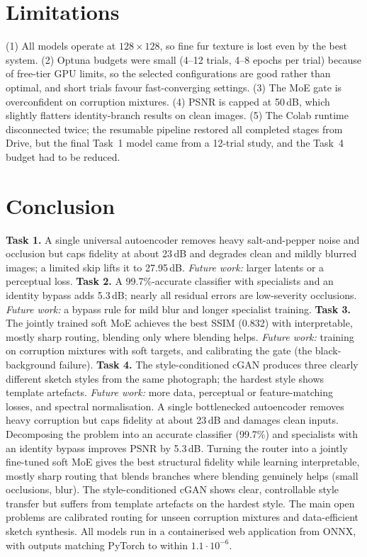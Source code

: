 \documentclass[conference]{IEEEtran}
\begin{document}
\section{Limitations}
(1) All models operate at $128\times128$, so fine fur texture is lost even by the best system. (2) Optuna budgets were small (4--12 trials, 4--8 epochs per trial) because of free-tier GPU limits, so the selected configurations are good rather than optimal, and short trials favour fast-converging settings. (3) The MoE gate is overconfident on corruption mixtures. (4) PSNR is capped at 50\,dB, which slightly flatters identity-branch results on clean images. (5) The Colab runtime disconnected twice; the resumable pipeline restored all completed stages from Drive, but the final Task~1 model came from a 12-trial study, and the Task~4 budget had to be reduced.

\section{Conclusion}
\textbf{Task 1.} A single universal autoencoder removes heavy salt-and-pepper noise and occlusion but caps fidelity at about 23\,dB and degrades clean and mildly blurred images; a limited skip lifts it to 27.95\,dB. \emph{Future work:} larger latents or a perceptual loss. \textbf{Task 2.} A 99.7\%-accurate classifier with specialists and an identity bypass adds 5.3\,dB; nearly all residual errors are low-severity occlusions. \emph{Future work:} a bypass rule for mild blur and longer specialist training. \textbf{Task 3.} The jointly trained soft MoE achieves the best SSIM (0.832) with interpretable, mostly sharp routing, blending only where blending helps. \emph{Future work:} training on corruption mixtures with soft targets, and calibrating the gate (the black-background failure). \textbf{Task 4.} The style-conditioned cGAN produces three clearly different sketch styles from the same photograph; the hardest style shows template artefacts. \emph{Future work:} more data, perceptual or feature-matching losses, and spectral normalisation. 
A single bottlenecked autoencoder removes heavy corruption but caps fidelity at about 23\,dB and damages clean inputs. Decomposing the problem into an accurate classifier (99.7\%) and specialists with an identity bypass improves PSNR by 5.3\,dB. Turning the router into a jointly fine-tuned soft MoE gives the best structural fidelity while learning interpretable, mostly sharp routing that blends branches where blending genuinely helps (small occlusions, blur). The style-conditioned cGAN shows clear, controllable style transfer but suffers from template artefacts on the hardest style. The main open problems are calibrated routing for unseen corruption mixtures and data-efficient sketch synthesis. All models run in a containerised web application from ONNX, with outputs matching PyTorch to within $1.1\cdot10^{-6}$.
\end{document}
